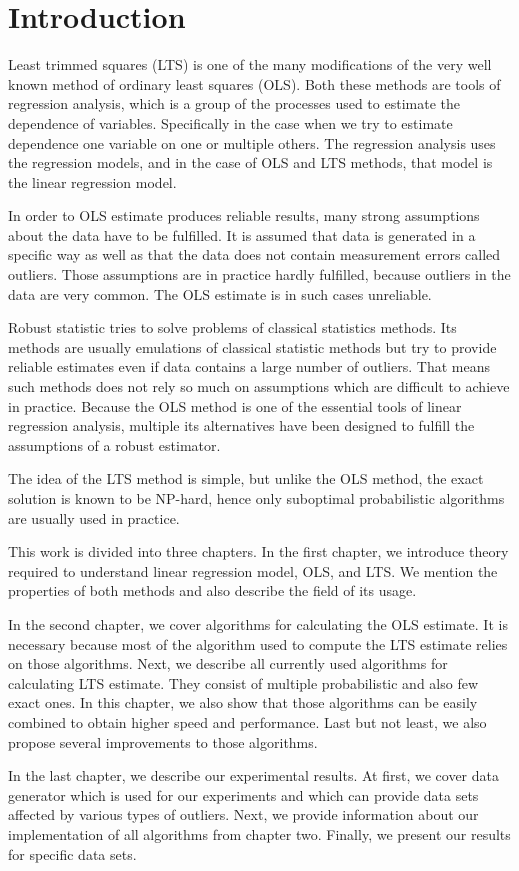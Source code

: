 \chapter{Introduction}
Least trimmed squares (LTS) is one of the many modifications of the very well known method of ordinary least squares (OLS). Both these methods are tools of regression analysis, which is a group of the processes used to estimate the dependence of variables. Specifically in the case when we try to estimate dependence one variable on one or multiple others. The regression analysis uses the regression models, and in the case of OLS and LTS methods, that model is the linear regression model.

In order to OLS estimate produces reliable results, many strong assumptions about the data have to be fulfilled. It is assumed that data is generated in a specific way as well as that the data does not contain measurement errors called outliers. Those assumptions are in practice hardly fulfilled, because outliers in the data are very common. The OLS estimate is in such cases unreliable.

Robust statistic tries to solve problems of classical statistics methods. Its methods are usually emulations of classical statistic methods but try to provide reliable estimates even if data contains a large number of outliers. That means such methods does not rely so much on assumptions which are difficult to achieve in practice. Because the OLS method is one of the essential tools of linear regression analysis, multiple its alternatives have been designed to fulfill the assumptions of a robust estimator.

The idea of the LTS method is simple, but unlike the OLS method, the exact solution is known to be NP-hard, hence only suboptimal probabilistic algorithms are usually used in practice.

This work is divided into three chapters. In the first chapter, we introduce theory required to understand linear regression model, OLS, and LTS. We mention the properties of both methods and also describe the field of its usage.

In the second chapter, we cover algorithms for calculating the OLS estimate. It is necessary because most of the algorithm used to compute the LTS estimate relies on those algorithms. Next, we describe all currently used algorithms for calculating LTS estimate. They consist of multiple probabilistic and also few exact ones. In this chapter, we also show that those algorithms can be easily combined to obtain higher speed and performance. Last but not least, we also propose several improvements to those algorithms.

In the last chapter, we describe our experimental results. At first, we cover data generator which is used for our experiments and which can provide data sets affected by various types of outliers. Next, we provide information about our implementation of all algorithms from chapter two. Finally, we present our results for specific data sets.
